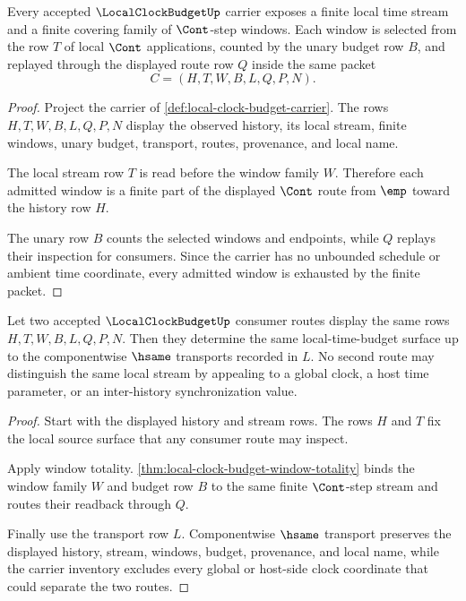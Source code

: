 \begin{theorem}
\label{thm:local-clock-budget-window-totality}
Every accepted $\LocalClockBudgetUp$ carrier exposes a finite local time stream and a finite covering family of $\Cont$-step windows. Each window is selected from the row $T$ of local $\Cont$ applications, counted by the unary budget row $B$, and replayed through the displayed route row $Q$ inside the same packet
$$
C=(H,T,W,B,L,Q,P,N).
$$
\end{theorem}
\begin{proof}
Project the carrier of \autoref{def:local-clock-budget-carrier}. The rows $H,T,W,B,L,Q,P,N$ display the observed history, its local stream, finite windows, unary budget, transport, routes, provenance, and local name.

The local stream row $T$ is read before the window family $W$. Therefore each admitted window is a finite part of the displayed $\Cont$ route from $\emp$ toward the history row $H$.

The unary row $B$ counts the selected windows and endpoints, while $Q$ replays their inspection for consumers. Since the carrier has no unbounded schedule or ambient time coordinate, every admitted window is exhausted by the finite packet.
\end{proof}

\begin{theorem}
\label{thm:local-clock-budget-route-determinacy}
Let two accepted $\LocalClockBudgetUp$ consumer routes display the same rows $H,T,W,B,L,Q,P,N$. Then they determine the same local-time-budget surface up to the componentwise $\hsame$ transports recorded in $L$. No second route may distinguish the same local stream by appealing to a global clock, a host time parameter, or an inter-history synchronization value.
\end{theorem}
\begin{proof}
Start with the displayed history and stream rows. The rows $H$ and $T$ fix the local source surface that any consumer route may inspect.

Apply window totality. \autoref{thm:local-clock-budget-window-totality} binds the window family $W$ and budget row $B$ to the same finite $\Cont$-step stream and routes their readback through $Q$.

Finally use the transport row $L$. Componentwise $\hsame$ transport preserves the displayed history, stream, windows, budget, provenance, and local name, while the carrier inventory excludes every global or host-side clock coordinate that could separate the two routes.
\end{proof}

